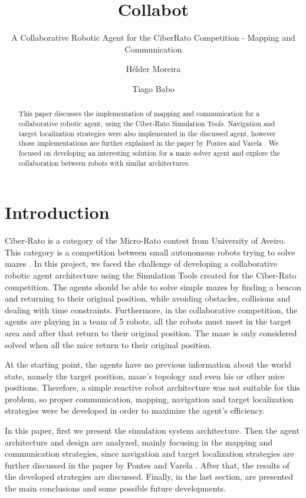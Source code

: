 \documentclass[oribibl]{llncs}
\title{Collabot}
\subtitle{A Collaborative Robotic Agent for the CiberRato Competition - Mapping and Communication}
\author{H\'{e}lder Moreira \and Tiago Babo}
\institute{Faculdade de Engenharia da Universidade do Porto}
\begin{document}
\maketitle
\begin{abstract}
This paper discusses the implementation of mapping and communication for a collaborative robotic agent, using the Ciber-Rato Simulation Tools. Navigation and target localization strategies were also implemented in the discussed agent, however those implementations are further explained in the paper by Pontes and Varela \cite{varelaepontes}.
We focused on developing an interesting solution for a maze solver agent and explore the collaboration between robots with similar architectures.
\end{abstract}

\section{Introduction}
Ciber-Rato is a category of the Micro-Rato contest from University of Aveiro.
This category is a competition between small autonomous robots trying to solve mazes \cite{Lau2002}. 
In this project, we faced the challenge of developing a collaborative robotic agent architecture using the Simulation Tools created for the Ciber-Rato competition. The agents should be able to solve simple mazes by finding a beacon and returning to their original position, while avoiding obstacles, collisions and dealing with time constraints. Furthermore, in the collaborative competition, the agents are playing in a team of 5 robots, all the robots must meet in the target area and after that return to their original position. The maze is only considered solved when all the mice return to their original position.

At the starting point, the agents have no previous information about the world state, namely the target position, maze's topology and even his or other mice positions. Therefore, a simple reactive robot architecture was not suitable for this problem, so proper communication, mapping, navigation and target localization strategies were be developed in order to maximize the agent's efficiency.

In this paper, first we present the simulation system architecture. Then the agent architecture and design are analyzed, mainly focusing in the mapping and communication strategies, since navigation and target localization strategies are further discussed in the paper by Pontes and Varela \cite{varelaepontes}. After that, the results of the developed strategies are discussed. Finally, in the last section, are presented the main conclusions and some possible future developments.
\end{document}
